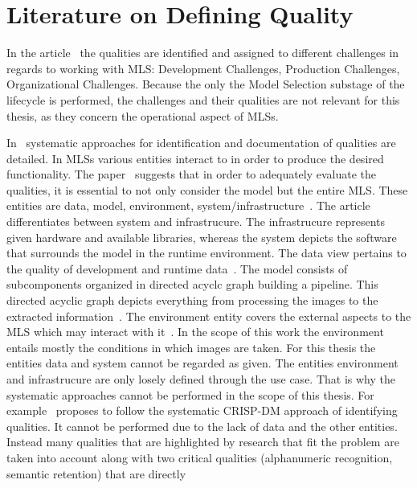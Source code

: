 \section{Literature on Defining Quality}
In the article~\cite{ashmore_assuring_2021} the qualities are identified and assigned to different
challenges in regards to working with \ac{MLS}: Development Challenges, Production Challenges,
Organizational Challenges.
Because the only the Model Selection substage of the lifecycle is performed, the challenges and their
qualities are not relevant for this thesis, as they concern the operational aspect of \acp{MLS}.

In~\cite{nakamichi_requirements-driven_2020,siebert_construction_2021} systematic approaches for
identification and documentation of qualities are detailed.
In \acp{MLS} various entities interact to in order to produce the desired functionality.
The paper~\cite{nakamichi_requirements-driven_2020} suggests that in order to adequately evaluate
the qualities, it is essential to not only consider the model but the entire \ac{MLS}.
These entities are data, model, environment,
system/infrastructure~\citep{nakamichi_requirements-driven_2020, siebert_construction_2021}.
The article~\cite{siebert_construction_2021} differentiates between system and infrastrucure.
The infrastrucure represents given hardware and available libraries, whereas the system depicts
the software that surrounds the model in the runtime environment.
The data view pertains to the quality of development and runtime
data~\citep{siebert_construction_2021}.
The model consists of subcomponents organized in directed acyclc graph building a
pipeline.
This directed acyclic graph depicts everything from processing the images to the extracted
information~\citep{siebert_construction_2021}.
The environment entity covers the external aspects to the \ac{MLS} which may interact with
it~\citep{siebert_construction_2021}.
In the scope of this work the environment entails mostly the conditions in which images are taken.
For this thesis the entities data and system cannot be regarded as given.
The entities environment and infrastrucure are only losely defined through the use case.
That is why the systematic approaches cannot be performed in the scope of this thesis.
For example~\cite{siebert_construction_2021} proposes to follow the systematic CRISP-DM approach of
identifying qualities.
It cannot be performed due to the lack of data and the other entities.
Instead many qualities that are highlighted by research that fit the problem are taken into account
along with two critical qualities (alphanumeric recognition, semantic retention) that are directly
